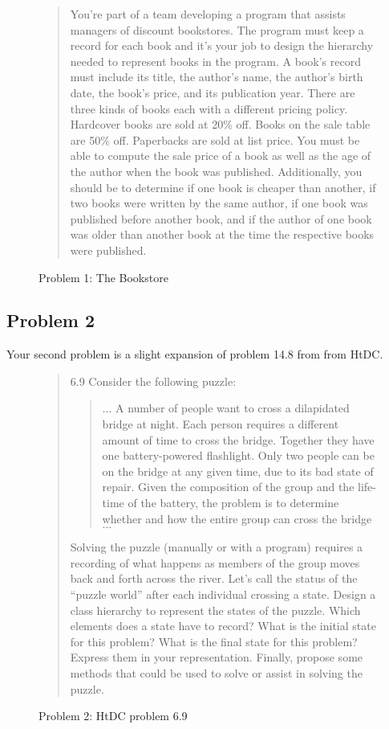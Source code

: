 \documentclass[]{tufte-handout}
\begin{document}
\begin{figure}
\begin{quote}
You're part of a team developing a program that assists managers of discount bookstores. The program must keep a record for each book and it's your job to design the hierarchy needed to represent books in the program. A book's record must include its title, the author's name, the author's birth date, the book's price, and its publication year. There are three kinds of books each with a different pricing policy. Hardcover books are sold at 20\% off. Books on the sale table are 50\% off. Paperbacks are sold at list price. You must be able to compute the sale price of a book as well as the age of the author when the book was published. Additionally, you should be to determine if one book is cheaper than another, if two books were written by the same author, if one book was published before another book, and if the author of one book was older than another book at the time the respective books were published. 
\end{quote}
\caption{Problem 1: The Bookstore}
\end{figure}


\subsection*{Problem 2}

Your second problem is a slight expansion of problem 14.8 from from HtDC\citep{htdc}. 

\begin{figure}
\begin{quote}
6.9 Consider the following puzzle:
\begin{quote}
$\ldots$ A number of people want to cross a dilapidated bridge at night. Each person requires a different amount of time to cross the bridge. Together they have one battery-powered flashlight. Only two people can be on the bridge at any given time, due to its bad state of repair. Given the composition of the group and the life-time of the battery,
the problem is to determine whether and how the entire group can cross the bridge $\ldots$
\end{quote}
Solving the puzzle (manually or with a program) requires a recording of what happens as members of the group moves back and forth across the river. Let's call the status of the ``puzzle world'' after each individual crossing a state. 
Design a class hierarchy to represent the states of the puzzle. Which elements does a state have to record? What is the initial state for this problem? What is the final state for this problem? Express them in your representation. Finally, propose some methods that could be used to solve or assist in solving the puzzle.
\end{quote}
\caption{Problem 2: HtDC problem 6.9}
\end{figure}




\end{document}
